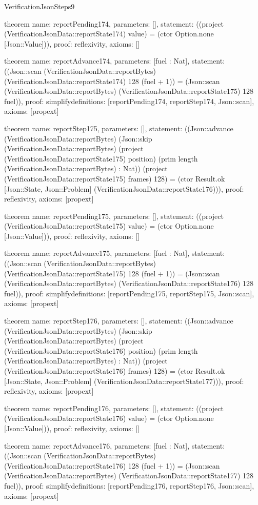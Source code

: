 \begin{lexlean}{VerificationJsonSteps9}
\begin{semanticmodule}
theorem{
  name: reportPending174,
  parameters: [],
  statement: ((project (VerificationJsonData::reportState174) value) = (ctor Option.none [Json::Value])),
  proof: reflexivity{},
  axioms: []
}

theorem{
  name: reportAdvance174,
  parameters: [fuel : Nat],
  statement: ((Json::scan (VerificationJsonData::reportBytes) (VerificationJsonData::reportState174) 128 (fuel + 1)) = (Json::scan (VerificationJsonData::reportBytes) (VerificationJsonData::reportState175) 128 fuel)),
  proof: simplify{definitions: [reportPending174, reportStep174, Json::scan]},
  axioms: [propext]
}

theorem{
  name: reportStep175,
  parameters: [],
  statement: ((Json::advance (VerificationJsonData::reportBytes) (Json::skip (VerificationJsonData::reportBytes) (project (VerificationJsonData::reportState175) position) (prim length (VerificationJsonData::reportBytes) : Nat)) (project (VerificationJsonData::reportState175) frames) 128) = (ctor Result.ok [Json::State, Json::Problem] (VerificationJsonData::reportState176))),
  proof: reflexivity{},
  axioms: [propext]
}

theorem{
  name: reportPending175,
  parameters: [],
  statement: ((project (VerificationJsonData::reportState175) value) = (ctor Option.none [Json::Value])),
  proof: reflexivity{},
  axioms: []
}

theorem{
  name: reportAdvance175,
  parameters: [fuel : Nat],
  statement: ((Json::scan (VerificationJsonData::reportBytes) (VerificationJsonData::reportState175) 128 (fuel + 1)) = (Json::scan (VerificationJsonData::reportBytes) (VerificationJsonData::reportState176) 128 fuel)),
  proof: simplify{definitions: [reportPending175, reportStep175, Json::scan]},
  axioms: [propext]
}

theorem{
  name: reportStep176,
  parameters: [],
  statement: ((Json::advance (VerificationJsonData::reportBytes) (Json::skip (VerificationJsonData::reportBytes) (project (VerificationJsonData::reportState176) position) (prim length (VerificationJsonData::reportBytes) : Nat)) (project (VerificationJsonData::reportState176) frames) 128) = (ctor Result.ok [Json::State, Json::Problem] (VerificationJsonData::reportState177))),
  proof: reflexivity{},
  axioms: [propext]
}

theorem{
  name: reportPending176,
  parameters: [],
  statement: ((project (VerificationJsonData::reportState176) value) = (ctor Option.none [Json::Value])),
  proof: reflexivity{},
  axioms: []
}

theorem{
  name: reportAdvance176,
  parameters: [fuel : Nat],
  statement: ((Json::scan (VerificationJsonData::reportBytes) (VerificationJsonData::reportState176) 128 (fuel + 1)) = (Json::scan (VerificationJsonData::reportBytes) (VerificationJsonData::reportState177) 128 fuel)),
  proof: simplify{definitions: [reportPending176, reportStep176, Json::scan]},
  axioms: [propext]
}


\end{semanticmodule}
\end{lexlean}
